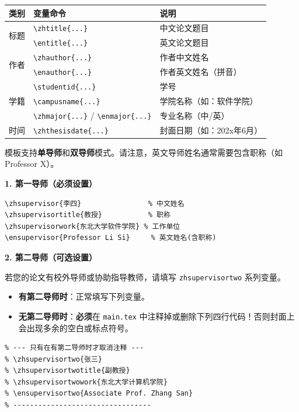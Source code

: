 \begin{table}[H]
  \centering
  \begin{tabular}{lll}
    \toprule
    类别 & 变量命令 & 说明 \\
    \midrule
    \multirow{2}{*}{标题} & \verb|\zhtitle{...}| & 中文论文题目 \\
    & \verb|\entitle{...}| & 英文论文题目 \\
    \midrule
    \multirow{2}{*}{作者} & \verb|\zhauthor{...}| & 作者中文姓名 \\
    & \verb|\enauthor{...}| & 作者英文姓名（拼音） \\
    \midrule
    \multirow{3}{*}{学籍} & \verb|\studentid{...}| & 学号 \\
    & \verb|\campusname{...}| & 学院名称（如：软件学院） \\
    & \verb|\zhmajor{...}| / \verb|\enmajor{...}| & 专业名称（中/英） \\
    \midrule
    时间 & \verb|\zhthesisdate{...}| & 封面日期（如：202x年6月） \\
    \bottomrule
  \end{tabular}
\end{table}

模板支持\textbf{单导师}和\textbf{双导师}模式。请注意，英文导师姓名通常需要包含职称（如 Professor X）。

\textbf{1. 第一导师（必须设置）}

\begin{verbatim}
\zhsupervisor{李四}                % 中文姓名
\zhsupervisortitle{教授}           % 职称
\zhsupervisorwork{东北大学软件学院} % 工作单位
\ensupervisor{Professor Li Si}     % 英文姓名(含职称)
\end{verbatim}

\textbf{2. 第二导师（可选设置）}

若您的论文有校外导师或协助指导教师，请填写 \verb|zhsupervisortwo| 系列变量。

\begin{itemize}
  \item \textbf{有第二导师时}：正常填写下列变量。
  \item \textbf{无第二导师时}：\textbf{必须}在 \texttt{main.tex} 中注释掉或删除下列四行代码！否则封面上会出现多余的空白或标点符号。
\end{itemize}

\begin{verbatim}
% --- 只有在有第二导师时才取消注释 ---
% \zhsupervisortwo{张三}
% \zhsupervisortwotitle{副教授}
% \zhsupervisortwowork{东北大学计算机学院}
% \ensupervisortwo{Associate Prof. Zhang San}
% ---------------------------------
\end{verbatim}

